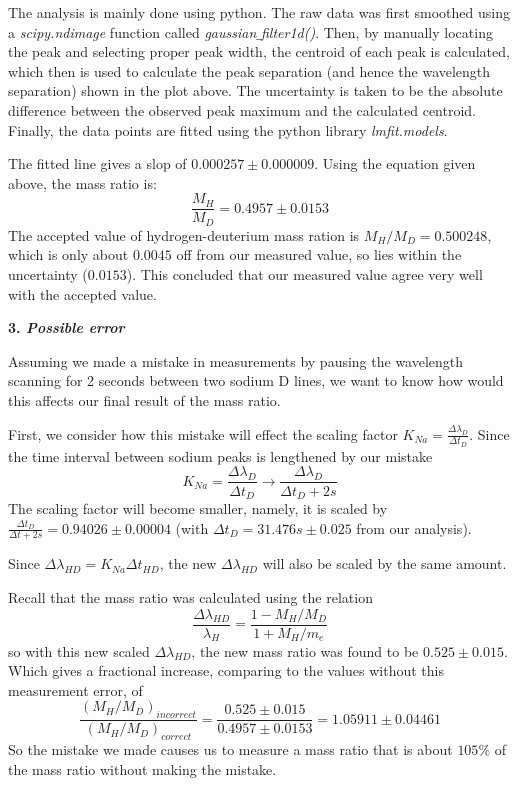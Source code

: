 \documentclass[12pt]{article}
\begin{document}
The analysis is mainly done using python. The raw data was first smoothed using a \textit{scipy.ndimage} function called  \textit{gaussian$\_$filter1d()}. Then, by manually locating the peak and selecting proper peak width, the centroid of each peak is calculated, which then is used to calculate the peak separation (and hence the wavelength separation) shown in the plot above. The uncertainty is taken to be the absolute difference between the observed peak maximum and the calculated centroid. Finally, the data points are fitted using the python library \textit{lmfit.models}.
\smallskip

The fitted line gives a slop of $0.000257 \pm 0.000009$. Using the equation given above, the mass ratio is: $$\frac{M_H}{M_D} = 0.4957 \pm 0.0153$$
The accepted value of hydrogen-deuterium mass ration is $M_H/M_D = 0.500248$, which is only about $0.0045$ off from our measured value, so lies within the uncertainty ($0.0153$). This concluded that our measured value agree very well with the accepted value.
\bigskip

\textbf{3. \textit{Possible error}}
\smallskip

Assuming we made a mistake in measurements by pausing the wavelength scanning for 2 seconds between two sodium D lines, we want to know how would this affects our final result of the mass ratio.
\smallskip

First, we consider how this mistake will effect the scaling factor $K_{Na} = \frac{\Delta \lambda_{D}}{\Delta t_D}$. Since the time interval between sodium peaks is lengthened by our mistake
$$K_{Na} = \frac{\Delta \lambda_{D}}{\Delta t_D} \rightarrow \frac{\Delta \lambda_{D}}{\Delta t_D + 2s}$$
The scaling factor will become smaller, namely, it is scaled by $\frac{\Delta t_D}{\Delta t +2s} = 0.94026 \pm 0.00004$ (with $\Delta t_D = 31.476s \pm 0.025$ from our analysis).

Since $\Delta \lambda_{HD} = K_{Na} \Delta t_{HD}$, the new $\Delta \lambda_{HD}$ will also be scaled by the same amount. 

Recall that the mass ratio was calculated using the relation
$$ \frac{\Delta \lambda_{HD}}{\lambda_H} = \frac{1- M_H/M_D}{1+M_H/m_e}$$
so with this new scaled $\Delta \lambda_{HD}$, the new mass ratio was found to be $0.525 \pm 0.015$. Which gives a fractional increase, comparing to the values without this measurement error, of 
$$\frac{(M_H/M_D)_{incorrect}}{(M_H/M_D)_{correct}} = \frac{0.525 \pm 0.015}{0.4957 \pm 0.0153} = 1.05911 \pm 0.04461$$
So the mistake we made causes us to measure a mass ratio that is about $105 \%$ of the mass ratio without making the mistake.
\end{document}

